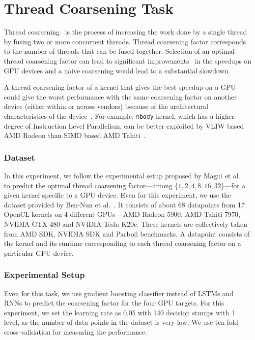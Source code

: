 \section{Thread Coarsening Task}
Thread coarsening~\cite{Volkov-Demmel-10.5555/1413370.1413402} is the process of increasing the work done by a single thread by fusing two or more concurrent threads. Thread coarsening factor corresponds to the number of threads that can be fused together. Selection of an optimal thread coarsening factor can lead to significant improvements~\cite{Magni-SC13-DBLP:conf/sc/MagniDO13} in the speedups on GPU devices and a naive coarsening would lead to a substantial slowdown.

A thread coarsening factor of a kernel that gives the best speedup on a GPU could give the worst performance with the same coarsening factor on another device (either within or across vendors) because of the architectural characteristics of the device~\cite{magni2014automatic, Stawinoga-10.1145/3194242}. For example, \texttt{nbody} kernel, which has a higher degree of Instruction Level Parallelism, can be better exploited by VLIW based AMD Radeon than SIMD based AMD Tahiti~\cite{magni2014automatic}.

\subsubsection*{Dataset} 
In this experiment, we follow the experimental setup proposed by Magni et al.~\cite{magni2014automatic} to predict the optimal thread coarsening factor---among $\{1,2,4,8,16,32\}$---for a given kernel specific to a GPU device. Even for this experiment, we use the dataset provided by Ben-Nun et al.~\cite{ncc}. It consists of about 68 datapoints from 17 OpenCL kernels on 4 different GPUs -- AMD Radeon 5900, AMD Tahiti 7970, NVIDIA GTX 480 and NVIDIA Tesla K20c.
These kernels are collectively taken from AMD SDK, NVIDIA SDK and Parboil benchmarks.
A datapoint consists of the kernel and its runtime corresponding to each thread coarsening factor on a particular GPU device.

\subsubsection*{Experimental Setup}
Even for this task, we use gradient boosting classifier instead of LSTMs and RNNs to predict the coarsening factor for the four GPU targets. For this experiment, we set the learning rate as 0.05 with 140 decision stumps with 1 level, as the number of data points in the dataset is very low. We use ten-fold cross-validation for measuring the performance.

